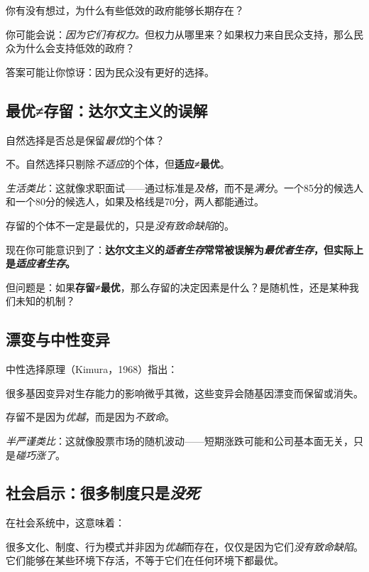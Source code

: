 \documentclass[../main.tex]{subfiles}
\begin{document}
	你有没有想过，为什么有些低效的政府能够长期存在？

	你可能会说：\textit{因为它们有权力。}但权力从哪里来？如果权力来自民众支持，那么民众为什么会支持低效的政府？

	答案可能让你惊讶：因为民众没有更好的选择。

	\subsection{最优≠存留：达尔文主义的误解}

	自然选择是否总是保留\textit{最优}的个体？

	不。自然选择只剔除\textit{不适应}的个体，但\textbf{适应≠最优}。

	\textit{生活类比}：这就像求职面试——通过标准是\textit{及格}，而不是\textit{满分}。一个85分的候选人和一个80分的候选人，如果及格线是70分，两人都能通过。

	存留的个体不一定是最优的，只是\textit{没有致命缺陷}的。

	\begin{tcolorbox}[colback=yellow!5, title=\textit{读者行为预测}]
		现在你可能意识到了：\textbf{达尔文主义的\textit{适者生存}常常被误解为\textit{最优者生存}，但实际上是\textit{适应者生存}。}
	\end{tcolorbox}

	但问题是：如果\textbf{存留≠最优}，那么存留的决定因素是什么？是随机性，还是某种我们未知的机制？

	\subsection{漂变与中性变异}

	中性选择原理（Kimura，1968）指出：

	很多基因变异对生存能力的影响微乎其微，这些变异会随基因漂变而保留或消失。

	存留不是因为\textit{优越}，而是因为\textit{不致命}。

	\textit{半严谨类比}：这就像股票市场的随机波动——短期涨跌可能和公司基本面无关，只是\textit{碰巧涨了}。

	\subsection{社会启示：很多制度只是\textit{没死}}

	在社会系统中，这意味着：

	很多文化、制度、行为模式并非因为\textit{优越}而存在，仅仅是因为它们\textit{没有致命缺陷}。它们能够在某些环境下存活，不等于它们在任何环境下都最优。
\end{document}
